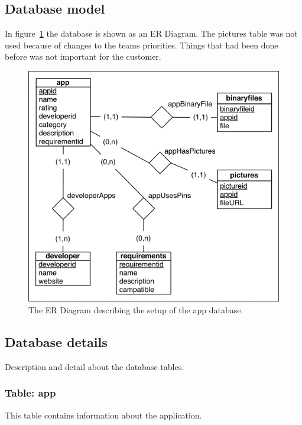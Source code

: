 	\subsection{Database model}

		In figure~\ref{fig:erdiagram} the database is shown as an ER Diagram. The pictures table was not used because of changes to the teams priorities. Things that had been done before was not important for the customer.

		\begin{figure}[H]
		\includegraphics[scale=1]{images/ER_Diagram.png}
		\caption[ER Diagram]{The ER Diagram describing the setup of the app database.}
		\label{fig:erdiagram}
		\end{figure}

	\subsection{Database details}

		Description and detail about the database tables.

		\subsubsection{Table: app}

			This table contains information about the application.\\

